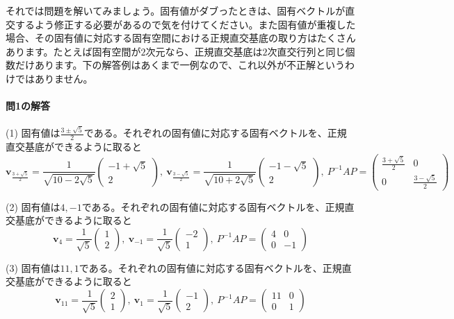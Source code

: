 それでは問題を解いてみましょう。固有値がダブったときは、固有ベクトルが直交するよう修正する必要があるので気を付けてください。また固有値が重複した場合、その固有値に対応する固有空間における正規直交基底の取り方はたくさんあります。たとえば固有空間が$2$次元なら、正規直交基底は$2$次直交行列と同じ個数だけあります。下の解答例はあくまで一例なので、これ以外が不正解というわけではありません。

\paragraph{問1の解答}

\noindent (1) 固有値は$\frac{3 \pm \sqrt{5}}{2}$である。それぞれの固有値に対応する固有ベクトルを、正規直交基底ができるように取ると
\[
\bm{v}_{\frac{3 + \sqrt{5}}{2}} =
\frac{1}{\sqrt{10 - 2 \sqrt{5}}}
\begin{pmatrix}
-1 + \sqrt{5} \\
2
\end{pmatrix}, \ 
\bm{v}_{\frac{3 - \sqrt{5}}{2}} =
\frac{1}{\sqrt{10 + 2 \sqrt{5}}}
\begin{pmatrix}
-1 - \sqrt{5} \\
2
\end{pmatrix}, \ 
P^{-1} A P 
= 
\begin{pmatrix}
\frac{3 + \sqrt{5}}{2} & 0 \\
0 & \frac{3 - \sqrt{5}}{2}
\end{pmatrix}
\]

\noindent (2) 固有値は$4, -1$である。それぞれの固有値に対応する固有ベクトルを、正規直交基底ができるように取ると
\[
\bm{v}_{4} =
\frac{1}{\sqrt{5}}
\begin{pmatrix}
1 \\
2
\end{pmatrix}, \ 
\bm{v}_{-1} =
\frac{1}{\sqrt{5}}
\begin{pmatrix}
-2 \\
1
\end{pmatrix}, \ 
P^{-1} A P 
= 
\begin{pmatrix}
4 & 0 \\
0 & -1
\end{pmatrix}
\]

\noindent (3) 固有値は$11, 1$である。それぞれの固有値に対応する固有ベクトルを、正規直交基底ができるように取ると
\[
\bm{v}_{11} =
\frac{1}{\sqrt{5}}
\begin{pmatrix}
2 \\
1
\end{pmatrix}, \ 
\bm{v}_{1} =
\frac{1}{\sqrt{5}}
\begin{pmatrix}
-1 \\
2
\end{pmatrix}, \ 
P^{-1} A P 
= 
\begin{pmatrix}
11 & 0 \\
0 & 1
\end{pmatrix}
\]

